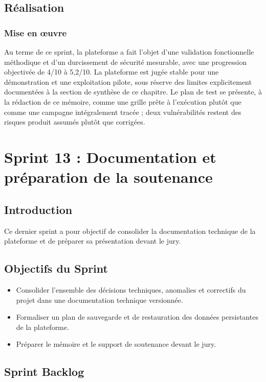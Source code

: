\subsection{Réalisation}

\subsubsection{Mise en œuvre}

Au terme de ce sprint, la plateforme a fait l'objet d'une validation fonctionnelle méthodique et d'un durcissement de sécurité mesurable, avec une progression objectivée de 4/10 à 5,2/10. La plateforme est jugée stable pour une démonstration et une exploitation pilote, sous réserve des limites explicitement documentées à la section de synthèse de ce chapitre. Le plan de test se présente, à la rédaction de ce mémoire, comme une grille prête à l'exécution plutôt que comme une campagne intégralement tracée ; deux vulnérabilités restent des risques produit assumés plutôt que corrigées.

\clearpage
\section{Sprint 13 : Documentation et préparation de la soutenance}

\subsection{Introduction}

Ce dernier sprint a pour objectif de consolider la documentation technique de la plateforme et de préparer sa présentation devant le jury.

\subsection{Objectifs du Sprint}

\begin{itemize}
    \item Consolider l'ensemble des décisions techniques, anomalies et correctifs du projet dans une documentation technique versionnée.
    \item Formaliser un plan de sauvegarde et de restauration des données persistantes de la plateforme.
    \item Préparer le mémoire et le support de soutenance devant le jury.
\end{itemize}

\subsection{Sprint Backlog}

